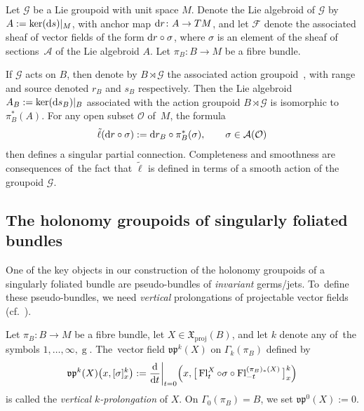 \documentclass[pdftex]{sigma}
\numberwithin{equation}{section}
\def\g{\operatorname{g}}
\def\proj{\operatorname{proj}}
\def\Fl{\operatorname{Fl}}
\def\FF{{\mathcal{F}}}
\def\AA{{\mathcal{A}}}
\def\GG{{\mathcal{G}}}
\def\OO{{\mathcal{O}}}
\def\XF{{\mathfrak{X}}}
\def\vpf{{\mathfrak{vp}}}
\begin{document}
\begin{Example}\label{equiex}
Let $\GG$ be a Lie groupoid with unit space $M$. Denote the Lie algebroid of $\GG$ by $A:=\ker({\rm d}s)|_{M}$, with anchor map ${\rm d}r\colon A\rightarrow TM$, and let $\FF$ denote the associated sheaf of vector fields of the form ${\rm d}r\circ\sigma$, where $\sigma$ is an element of the sheaf of sections~$\AA$ of the Lie algebroid $A$. Let $\pi_{B}\colon B\rightarrow M$ be a fibre bundle.

If $\GG$ acts on $B$, then denote by $B\rtimes\GG$ the associated action groupoid~\cite[Example 2.2]{aac1}, with range and source denoted $r_{B}$ and $s_{B}$ respectively. Then the Lie algebroid $A_{B}:=\ker({\rm d}s_{B})|_{B}$ associated with the action groupoid $B\rtimes\GG$ is isomorphic to $\pi_{B}^{*}(A)$. For any open subset $\OO$ of~$M$, the formula
\begin{gather*}
\tilde{\ell}({\rm d}r\circ\sigma):={\rm d}r_{B}\circ\pi_{B}^{*}(\sigma),\qquad \sigma\in\AA(\OO)
\end{gather*}
then defines a singular partial connection. Completeness and smoothness are consequences of~the fact that $\tilde{\ell}$ is defined in terms of a smooth action of the groupoid $\GG$.
\end{Example}


\subsection{The holonomy groupoids of singularly foliated bundles}

One of the key objects in our construction of the holonomy groupoids of a singularly foliated bundle are pseudo-bundles of \textit{invariant} germs/jets. To~define these pseudo-bundles, we need \textit{vertical} prolongations of projectable vector fields (cf.~\cite[Definition~1.15]{varbi}).

\begin{Definition}
Let $\pi_{B}\colon B\rightarrow M$ be a fibre bundle, let $X\in\XF_{\proj}(B)$, and let $k$ denote any of~the symbols $1,\dots,\infty,\g$. The~vector field $\vpf^{k}(X)$ on $\Gamma_{k}(\pi_{B})$ defined by
\begin{gather*}
\vpf^{k}(X)\big(x,[\sigma]^{k}_{x}\big):=\frac{\rm d}{{\rm d}t}\bigg|_{t=0}\Big(x,\big[\Fl^{X}_{t}\circ\sigma\circ\Fl^{(\pi_{B})_{*}(X)}_{-t}\big]_{x}^{k}\Big)
\end{gather*}
is called the \textit{vertical $k$-prolongation} of $X$. On $\Gamma_{0}(\pi_{B}) = B$, we set $\vpf^{0}(X):=0$.
\end{Definition}
\end{document}
